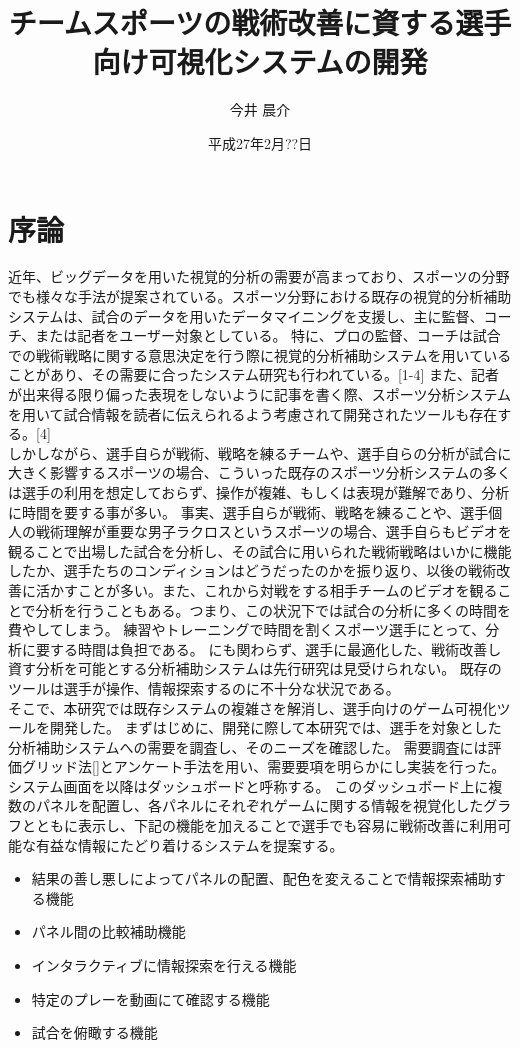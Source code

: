 \documentclass[sotsuron]{kuee}
\title{チームスポーツの戦術改善に資する選手向け可視化システムの開発}
\author{今井 晨介}
\date{平成27年2月??日}
\begin{document}
\maketitle	
\tableofcontents

\chapter{序論}
近年、ビッグデータを用いた視覚的分析の需要が高まっており、スポーツの分野でも様々な手法が提案されている。スポーツ分野における既存の視覚的分析補助システムは、試合のデータを用いたデータマイニングを支援し、主に監督、コーチ、または記者をユーザー対象としている。
特に、プロの監督、コーチは試合での戦術戦略に関する意思決定を行う際に視覚的分析補助システムを用いていることがあり、その需要に合ったシステム研究も行われている。[1-4]
また、記者が出来得る限り偏った表現をしないように記事を書く際、スポーツ分析システムを用いて試合情報を読者に伝えられるよう考慮されて開発されたツールも存在する。[4]
\\しかしながら、選手自らが戦術、戦略を練るチームや、選手自らの分析が試合に大きく影響するスポーツの場合、こういった既存のスポーツ分析システムの多くは選手の利用を想定しておらず、操作が複雑、もしくは表現が難解であり、分析に時間を要する事が多い。
事実、選手自らが戦術、戦略を練ることや、選手個人の戦術理解が重要な男子ラクロスというスポーツの場合、選手自らもビデオを観ることで出場した試合を分析し、その試合に用いられた戦術戦略はいかに機能したか、選手たちのコンディションはどうだったのかを振り返り、以後の戦術改善に活かすことが多い。また、これから対戦をする相手チームのビデオを観ることで分析を行うこともある。つまり、この状況下では試合の分析に多くの時間を費やしてしまう。
練習やトレーニングで時間を割くスポーツ選手にとって、分析に要する時間は負担である。
にも関わらず、選手に最適化した、戦術改善し資す分析を可能とする分析補助システムは先行研究は見受けられない。
既存のツールは選手が操作、情報探索するのに不十分な状況である。
\\そこで、本研究では既存システムの複雑さを解消し、選手向けのゲーム可視化ツールを開発した。
まずはじめに、開発に際して本研究では、選手を対象とした分析補助システムへの需要を調査し、そのニーズを確認した。
需要調査には評価グリッド法[]とアンケート手法を用い、需要要項を明らかにし実装を行った。
システム画面を以降はダッシュボードと呼称する。
このダッシュボード上に複数のパネルを配置し、各パネルにそれぞれゲームに関する情報を視覚化したグラフとともに表示し、下記の機能を加えることで選手でも容易に戦術改善に利用可能な有益な情報にたどり着けるシステムを提案する。
	\begin{itemize}
		\item 結果の善し悪しによってパネルの配置、配色を変えることで情報探索補助する機能
		\item パネル間の比較補助機能
		\item インタラクティブに情報探索を行える機能
		\item 特定のプレーを動画にて確認する機能
		\item 試合を俯瞰する機能
	\end{itemize}
\end{document}

